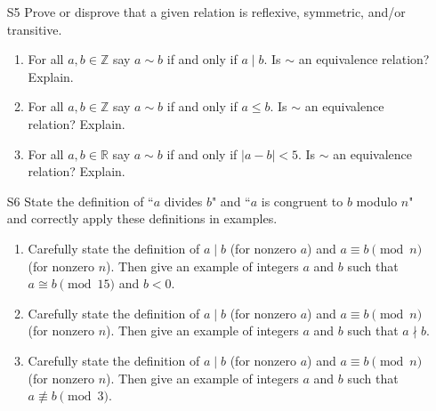 \documentclass[11pt]{article}
\newcommand{\Z}{\mathbb{Z}}
\newcommand{\R}{\mathbb{R}}
\begin{document}
\begin{itemize}
\newpage

\item[S5] Prove or disprove that a given relation is reflexive, symmetric, and/or transitive.
	\begin{enumerate}
	\item For all $a,b\in \Z$ say $a\sim b$ if and only if $a\mid b$.  Is $\sim$ an equivalence relation? Explain.
	\item For all $a,b \in \Z$ say $a\sim b$ if and only if $a\leq b$.  Is $\sim$ an equivalence relation? Explain.
	\item For all $a,b\in \R$ say $a\sim b$ if and only if $|a-b|<5$.  Is $\sim$ an equivalence relation? Explain.
	\end{enumerate}
	

\newpage

\item[S6] State the definition of ``$a$ divides $b$" and ``$a$ is congruent to $b$ modulo $n$" and correctly apply these definitions in examples.
	\begin{enumerate}
	\item  Carefully state the definition of $a\mid b$ (for nonzero $a$) and $a \equiv b\pmod{n}$ (for nonzero $n$).  Then give an example of integers $a$ and $b$ such that $a\cong b \pmod{15}$ and $b<0$.
	\item Carefully state the definition of $a\mid b$ (for nonzero $a$) and $a \equiv b\pmod{n}$ (for nonzero $n$).  Then give an example of integers $a$ and $b$ such that $a \nmid b$.
	\item Carefully state the definition of $a\mid b$ (for nonzero $a$) and $a \equiv b\pmod{n}$ (for nonzero $n$).  Then give an example of integers $a$ and $b$ such that $a\not\equiv b \pmod{3}$.
	\end{enumerate}
\end{itemize}
\end{document}
